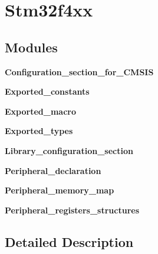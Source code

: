 \section{Stm32f4xx}
\label{group__stm32f4xx}
\subsection*{Modules}
\begin{DoxyCompactItemize}
\item 
\textbf{ Configuration\+\_\+section\+\_\+for\+\_\+\+C\+M\+S\+IS}
\item 
\textbf{ Exported\+\_\+constants}
\item 
\textbf{ Exported\+\_\+macro}
\item 
\textbf{ Exported\+\_\+types}
\item 
\textbf{ Library\+\_\+configuration\+\_\+section}
\item 
\textbf{ Peripheral\+\_\+declaration}
\item 
\textbf{ Peripheral\+\_\+memory\+\_\+map}
\item 
\textbf{ Peripheral\+\_\+registers\+\_\+structures}
\end{DoxyCompactItemize}


\subsection{Detailed Description}
